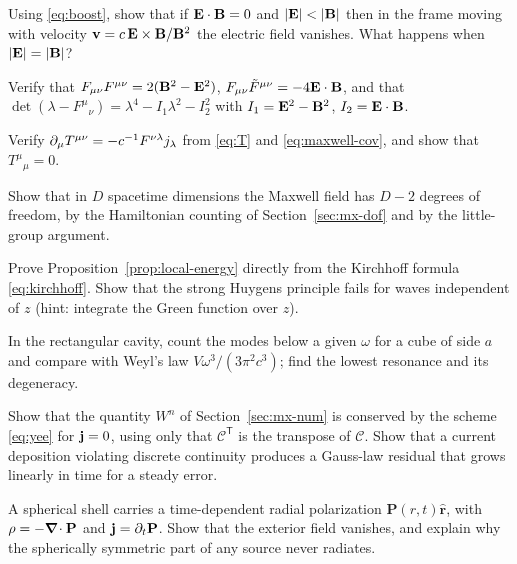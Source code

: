 \begin{problem}
Using \eqref{eq:boost}, show that if $\mathbf{E}\cdot\mathbf{B}=0$ and $|\vE|<|\vB|$ then
in the frame moving with velocity $\mathbf{v}=c\,\mathbf{E}\times\mathbf{B}/\mathbf{B}^2$ the
electric field vanishes.  What happens when $|\mathbf{E}|=|\mathbf{B}|$?
\end{problem}

\begin{problem}
Verify that $F_{\mu\nu}F^{\mu\nu}=2(\mathbf{B}^2-\mathbf{E}^2)$,
$F_{\mu\nu}\tilde F^{\mu\nu}=-4\mathbf{E}\cdot\mathbf{B}$, and that
$\det(\lambda-F^\mu{}_\nu)=\lambda^4-I_1\lambda^2-I_2^2$ with
$I_1=\mathbf{E}^2-\mathbf{B}^2$, $I_2=\mathbf{E}\cdot\mathbf{B}$.
\end{problem}

\begin{problem}
Verify $\partial_\mu T^{\mu\nu}=-c^{-1}F^{\nu\lambda}j_\lambda$ from
\eqref{eq:T} and \eqref{eq:maxwell-cov}, and show that $T^\mu{}_\mu=0$.
\end{problem}

\begin{problem}
Show that in $D$ spacetime dimensions the Maxwell field has $D-2$ degrees of
freedom, by the Hamiltonian counting of Section~\ref{sec:mx-dof}
and by the little-group argument.
\end{problem}

\begin{problem}
Prove Proposition~\ref{prop:local-energy} directly from the Kirchhoff
formula \eqref{eq:kirchhoff}.  Show that the strong Huygens principle fails
for waves independent of $z$ (hint: integrate the Green function over $z$).
\end{problem}

\begin{problem}
In the rectangular cavity, count the modes below a given $\omega$ for a cube of side $a$
and compare with Weyl's law $V\omega^3/(3\pi^2c^3)$; find the lowest resonance
and its degeneracy.
\end{problem}

\begin{problem}
Show that the quantity $W^n$ of Section~\ref{sec:mx-num} is conserved by the scheme
\eqref{eq:yee} for $\mathbf{j}=0$, using only
that $\mathcal C^{\mathsf T}$ is the transpose of $\mathcal C$.  Show that a
current deposition violating discrete continuity produces a Gauss-law
residual that grows linearly in time for a steady error.
\end{problem}

\begin{problem}
A spherical shell carries a time-dependent radial polarization
$\mathbf P(r,t)\hat{\mathbf r}$, with $\rho=-\boldsymbol{\nabla}\!\cdot\mathbf P$ and
$\mathbf{j}=\partial_t\mathbf P$.  Show that the exterior field vanishes, and explain
why the spherically symmetric part of any source never radiates.
\end{problem}
